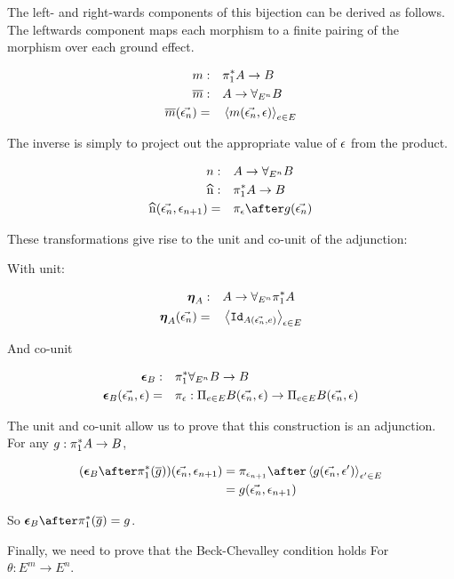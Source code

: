 \documentclass{Report}
\begin{document}
The left- and right-wards components of this bijection can be derived as follows. The leftwards component maps each morphism to a finite pairing of the morphism over each ground effect.

\begin{align}
    m:&\quad \pi_1^* A \rightarrow B\\
    \overline{m}:&\quad A\rightarrow \forall_{E^n} B\\
    \overline{m}(\vec{\epsilon_n}) =&\quad \left\langle m(\vec{\epsilon_n}, \epsilon)\right\rangle_{e\in E}
\end{align}

The inverse is simply to project out the appropriate value of $\epsilon$ from the product.

\begin{align}
    n:&\quad A \rightarrow \allEn B\\
    \widehat{n}:&\quad \pstar A\rightarrow B\\
    \widehat{n}(\env, \e_{n+1}) =&\quad\pi_\e\after g(\env)
\end{align}

These transformations give rise to the unit and co-unit of the adjunction:

With unit:

\begin{align}
    \boldsymbol{\eta}_{A}:&\quad A \rightarrow \forall_{E^n}\pi_1^* A\\
    \boldsymbol{\eta}_{A}(\vec{\epsilon_n})=&\quad\left\langle\texttt{Id}_{A(\vec{\epsilon_n},e)}\right\rangle_{\epsilon\in E}
\end{align}


And co-unit


\begin{align}
    \boldsymbol{\epsilon}_{B} : &\quad \pi_1^*\forall_{E^n} B \rightarrow B\\
    \boldsymbol{\epsilon}_{B}(\vec{\epsilon_n}, \epsilon) =&\quad \pi_\epsilon : \Pi_{e\in E}B(\vec{\epsilon_n}, \epsilon)\rightarrow \Pi_{e\in E}B(\vec{\epsilon_n}, \epsilon)
\end{align}

The unit and co-unit allow us to prove that this construction is an adjunction. For any $g: \pi_1^* A \rightarrow B$,

\begin{align}
    (\counit{B}\after\pstar(\bar{g}))(\env, \e_{n+1}) & = \pi_{\e_{n+1}}\after\finpr{g(\env, \e')}{\e'\in E}\\
    &= g(\env, \e_{n+1})
\end{align}


So $\counit{B}\after\pstar(\bar{g}) = g$.


Finally, we need to prove that the Beck-Chevalley condition holds
For $\theta: E^m \rightarrow E^n$.
\end{document}
